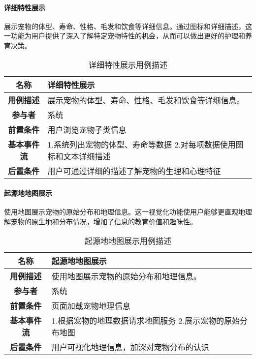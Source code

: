 \paragraph{详细特性展示}

展示宠物的体型、寿命、性格、毛发和饮食等详细信息。通过图标和详细描述，这一功能为用户提供了深入了解特定宠物特性的机会，从而可以做出更好的护理和养育决策。

\begin{table}[H]
	\centering
	\caption{详细特性展示用例描述}
	\renewcommand\arraystretch{1.5}
	\begin{tabular}{|c|>{\raggedright\arraybackslash}p{10cm}|}
		\hline
		\textbf{名称} & \textbf{详细特性展示} \\ \hline
		\textbf{用例描述} & 展示宠物的体型、寿命、性格、毛发和饮食等详细信息。 \\ \hline
		\textbf{参与者} & 系统 \\ \hline
		\textbf{前置条件} & 用户浏览宠物子类信息 \\ \hline
		\textbf{基本事件流} & 
		1.系统列出宠物的体型、寿命等数据\newline
		2.对每项数据使用图标和文本详细描述\\
		\hline
		\textbf{后置条件} & 用户可通过详细的描述了解宠物的生理和心理特征 \\ \hline
	\end{tabular}
\end{table}

\paragraph{起源地地图展示}

使用地图展示宠物的原始分布和地理信息。这一视觉化功能使用户能够更直观地理解宠物的原生地和分布情况，增加了信息的教育价值和趣味性。

\begin{table}[H]
	\centering
	\caption{起源地地图展示用例描述}
	\renewcommand\arraystretch{1.5}
	\begin{tabular}{|c|>{\raggedright\arraybackslash}p{10cm}|}
		\hline
		\textbf{名称} & \textbf{起源地地图展示} \\ \hline
		\textbf{用例描述} & 使用地图展示宠物的原始分布和地理信息。 \\ \hline
		\textbf{参与者} & 系统 \\ \hline
		\textbf{前置条件} & 页面加载宠物地理信息 \\ \hline
		\textbf{基本事件流} & 
		1.根据宠物的地理数据请求地图服务\newline
		2.展示宠物的原始分布地图\\
		\hline
		\textbf{后置条件} & 用户可视化地理信息，加深对宠物分布的认识 \\ \hline
	\end{tabular}
\end{table}

